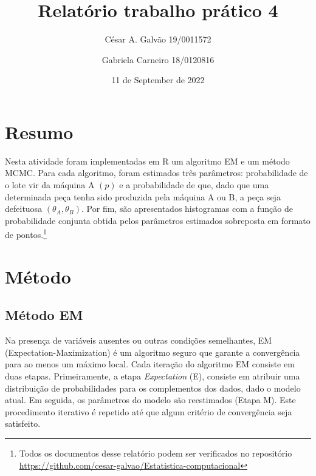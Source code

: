 \documentclass[
]{article}
\title{Relatório trabalho prático 4}
\author{César A. Galvão 19/0011572 \and Gabriela Carneiro 18/0120816}
\date{11 de September de 2022}
\begin{document}
\maketitle

\newpage{}

{
\setcounter{tocdepth}{2}
\tableofcontents
}
\let\oldsection\section
\renewcommand\section{\clearpage\oldsection}

\hypertarget{resumo}{%
\section{Resumo}\label{resumo}}

Nesta atividade foram implementadas em R um algoritmo EM e um método
MCMC. Para cada algoritmo, foram estimados três parâmetros:
probabilidade de o lote vir da máquina A \((p)\) e a probabilidade de
que, dado que uma determinada peça tenha sido produzida pela máquina A
ou B, a peça seja defeituosa \((\theta_A, \theta_B)\). Por fim, são
apresentados histogramas com a função de probabilidade conjunta obtida
pelos parâmetros estimados sobreposta em formato de pontos.\footnote{Todos
  os documentos desse relatório podem ser verificados no repositório
  \url{https://github.com/cesar-galvao/Estatistica-computacional}}

\hypertarget{muxe9todo}{%
\section{Método}\label{muxe9todo}}

\hypertarget{muxe9todo-em}{%
\subsection{Método EM}\label{muxe9todo-em}}

Na presença de variáveis ausentes ou outras condições semelhantes, EM
(Expectation-Maximization) é um algoritmo seguro que garante a
convergência para ao menos um máximo local. Cada iteração do algoritmo
EM consiste em duas etapas. Primeiramente, a etapa \emph{Expectation}
(E), consiste em atribuir uma distribuição de probabilidades para os
complementos dos dados, dado o modelo atual. Em seguida, os parâmetros
do modelo são reestimados (Etapa M). Este procedimento iterativo é
repetido até que algum critério de convergência seja satisfeito.
\end{document}
